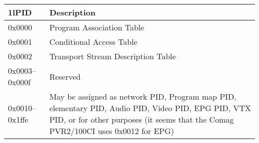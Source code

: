 \documentclass{scrartcl}
\providecommand*\toprule{\hline}
\providecommand*\midrule{\hline}
\providecommand*\bottomrule{\hline}
\newcommand*{\Comag}{Comag PVR2/100CI\xspace}
\begin{document}
\begin{table}
  \centering
  \begin{tabularx}{\textwidth}{>{\ttfamily}l>{\raggedright}X}
    \toprule
    \multicolumn1l{PID} & Description \tabularnewline
    \midrule
    0x0000 & Program Association Table \tabularnewline
    0x0001 & Conditional Access Table \tabularnewline
    0x0002 & Transport Stream Description Table \tabularnewline
    0x0003--0x000f & Reserved \tabularnewline
    0x0010--0x1ffe & May be assigned as network PID, Program map PID,
    elementary PID, Audio PID, Video PID, EPG PID, VTX PID, or for other
    purposes (it seems that the \Comag uses 0x0012 for EPG) \tabularnewline
    \bottomrule
  \end{tabularx}
  \label{tab:PID}
\end{table}
\end{document}
